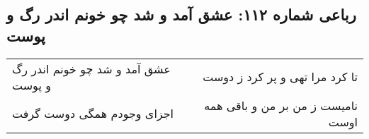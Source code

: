 \begin{center}
\section*{رباعی شماره ۱۱۲: عشق آمد و شد چو خونم اندر رگ و پوست}
\label{sec:sh112}
\begin{longtable}{l p{0.5cm} r}
عشق آمد و شد چو خونم اندر رگ و پوست
&&
تا کرد مرا تهی و پر کرد ز دوست
\\
اجزای وجودم همگی دوست گرفت
&&
نامیست ز من بر من و باقی همه اوست
\\
\end{longtable}
\end{center}
